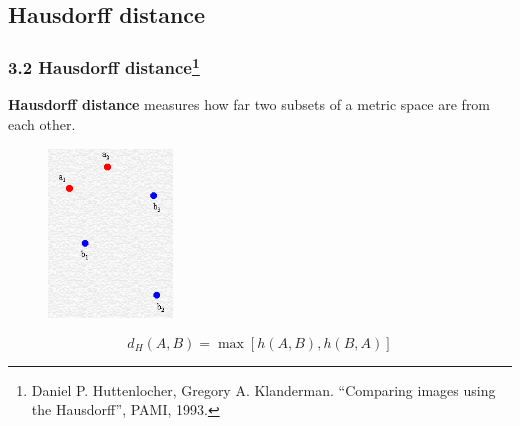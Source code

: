 \documentclass[notheorems,serif,table,compress]{beamer}  %
\begin{document}
\subsection{Hausdorff distance}

\begin{frame}
\frametitle{3.2 Hausdorff distance\footnote{Daniel P. Huttenlocher, Gregory A. Klanderman. ``Comparing images using the Hausdorff'', PAMI, 1993.}}%
   {\color{blue}\textbf{Hausdorff distance}} measures how far two subsets of a metric space are from each other.
   \begin{figure}[!ht]
    \centering
    \includegraphics[width=1.3in]{dian.png}
   \end{figure}
   \begin{displaymath}
d_{H}(A,B)=\max[h(A,B),h(B,A)]
   \end{displaymath}
\end{frame}


\end{document}
